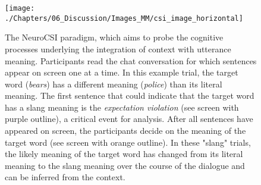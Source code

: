 \begin{figure}[!ht]
	\centering
	\texttt{[image: ./Chapters/06\_Discussion/Images\_MM/csi\_image\_horizontal]}
	\caption{The NeuroCSI paradigm, which aims to probe the cognitive processes underlying the integration of context with utterance meaning. Participants read the chat conversation for which sentences appear on screen one at a time. In this example trial, the target word (\textit{bears}) has a different meaning (\textit{police}) than its literal meaning. The first sentence that could indicate that the target word has a slang meaning is the \textit{expectation violation} (see screen with purple outline), a critical event for analysis. After all sentences have appeared on screen, the participants decide on the meaning of the target word (see screen with orange outline). In these "slang" trials, the likely meaning of the target word has changed from its literal meaning to the slang meaning over the course of the dialogue and can be inferred from the context. }
    \vspace*{-10pt}
	\label{fig:csi}
\end{figure}
